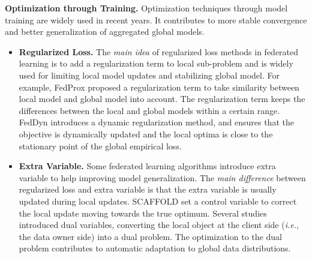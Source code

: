 \documentclass[11pt]{article}
\newcommand{\ie}{\textit{i.e.},\xspace}
\newcommand{\fakeparagraph}[1]{\vspace{1mm}\noindent\textbf{#1.}}
\begin{document}
\fakeparagraph{Optimization through Training}
Optimization techniques through model training are widely used in recent years. It contributes to more stable convergence and better generalization of aggregated global models.
\begin{itemize}
    \item \textbf{Regularized Loss.} 
    The \textit{main idea} of regularized loss methods in federated learning is to add a regularization term to local sub-problem and is widely used for limiting local model updates and stabilizing global model. 
    For example, \textsf{FedProx} \cite{DBLP:conf/mlsys/LiSZSTS20} proposed a regularization term to take similarity between local model and global model into account. The regularization term keeps the differences between the local and global models within a certain range. 
    \textsf{FedDyn} \cite{DBLP:conf/iclr/AcarZNMWS21} introduces a dynamic regularization method, and ensures that the objective is dynamically updated and the local optima is close to the stationary point of the global empirical loss. 
	
    \item \textbf{Extra Variable.}
    Some federated learning algorithms introduce extra variable to help improving model generalization. The \textit{main difference} between regularized loss and extra variable is that the extra variable is usually updated during local updates.
    \textsf{SCAFFOLD} \cite{DBLP:conf/icml/KarimireddyKMRS20} set a control variable to correct the local update moving towards the true optimum. 
    Several studies \cite{DBLP:conf/nips/Tran-DinhPPN21, DBLP:conf/icde/GongLF22} introduced dual variables, converting the local object at the client side (\ie the data owner side) into a dual problem. The optimization to the dual problem contributes to automatic adaptation to global data distributions.
\end{itemize}
\end{document}
